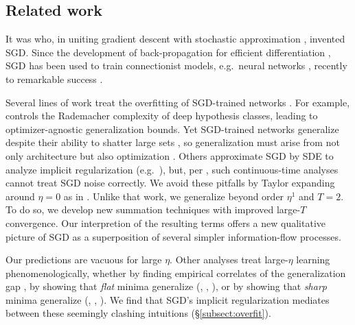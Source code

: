 \documentclass[final,12pt]{colt2021} %
\begin{document}
        \newpage
        \subsection{Related work}
    

            It was \cite{ki52} who, in uniting gradient descent \citep{ca47}
            with stochastic approximation \citep{ro51}, invented SGD.  Since
            the development of back-propagation for efficient differentiation
            \citep{we74}, SGD has been used to train connectionist models,
            e.g.\ neural networks \citep{bo91}, recently to remarkable success
            \citep{le15}.
        
        
            Several lines of work treat the overfitting of SGD-trained networks
            \citep{ne17a}.  For example, \cite{ba17} controls the Rademacher
            complexity of deep hypothesis classes, leading to
            optimizer-agnostic generalization bounds.  Yet SGD-trained networks
            generalize despite their ability to shatter large sets
            \citep{zh17}, so generalization must arise from not only
            architecture but also optimization \citep{ne17b}.  Others
            approximate SGD by SDE to analyze implicit regularization (e.g.\
            \cite{ch18}), but, per \cite{ya19a}, such continuous-time analyses
            cannot treat SGD noise correctly.
            We avoid these pitfalls by Taylor expanding around $\eta=0$ as in
            \cite{ro18}.  Unlike that work, we generalize beyond order $\eta^1$
            and $T=2$.  To do so, we develop new summation techniques with
            improved large-$T$ convergence.  Our interpretion of the resulting
            terms offers a new qualitative picture of SGD as a superposition of
            several simpler information-flow processes.
            
        
            Our predictions are vacuous for large $\eta$.  Other analyses treat
            large-$\eta$ learning phenomenologically, whether by finding
            empirical correlates of the generalization gap \citep{li18}, by
            showing that \emph{flat} minima generalize (\cite{ho17},
            \cite{ke17}, \cite{wa18}), or by showing that \emph{sharp} minima
            generalize (\cite{st56}, \cite{di17}, \cite{wu18}).  We find that
            SGD's implicit regularization mediates between these seemingly
            clashing intuitions (\S \ref{subsect:overfit}).
            
\end{document}
